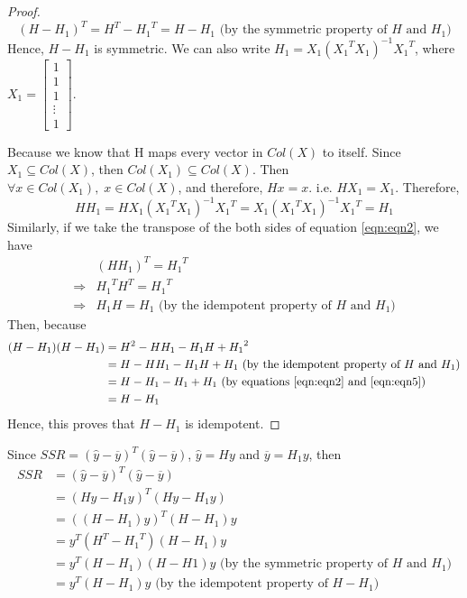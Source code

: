 \begin{answer}
\begin{proof}
    \begin{equation}
        {(H - H_1)}^T = H^T - {H_1}^T = H - H_1 \text{ (by the symmetric property of } H \text{ and } H_1 \text{)}
    \end{equation}
    Hence, $H-H_1$ is symmetric. We can also write $H_1 = X_1{({X_1}^TX_1)}^{-1}{X_1}^T$, where $X_1 = \left[\begin{smallmatrix}1 \\1\\1\\ \vdots\\1\end{smallmatrix}\right]$.
    
    Because we know that H maps every vector in $Col(X)$ to itself. Since $X_1 \subseteq Col(X)$, then $Col(X_1) \subseteq Col(X)$. Then $\forall x \in Col(X_1),\; x \in Col(X)$, and therefore, $Hx = x$. i.e. $HX_1 = X_1$.
     Therefore, 
    \begin{equation}
        HH_1 = HX_1{({X_1}^TX_1)}^{-1}{X_1}^{T} = X_1{({X_1}^TX_1)}^{-1}{X_1}^{T} = H_1 \label{eqn:eqn2}
    \end{equation}
    Similarly, if we take the transpose of the both sides of equation \ref{eqn:eqn2}, we have 
    \begin{align}
        &{(HH_1)}^T = {H_1}^T\\
        \Rightarrow & {H_1}^T H^T = {H_1}^T\\
        \Rightarrow & H_1H = H_1 \text{ (by the idempotent property of } H \text{ and } H_1 \text{)}\label{eqn:eqn5}
    \end{align}
    Then, because
    \begin{align}
        (H-H_1)(H-H_1) &= H^2 - HH_1 - H_1H + {H_1}^2\\ 
        &= H - HH_1 - H_1H + H_1 \text{ (by the idempotent property of } H \text{ and } H_1 \text{)}\\
        &= H - H_1 - H_1 + H_1 \text{ (by equations \ref{eqn:eqn2} and \ref{eqn:eqn5})}\\
        &= H - H_1
    \end{align}
    Hence, this proves that $H - H_1$ is idempotent.
\end{proof}
Since $SSR = {(\hat{y} - \overline{y})}^T(\hat{y} - \overline{y})$, $\hat{y} = Hy$ and $\overline{y} = H_1y$, then
\begin{align}
    SSR &= {(\hat{y} - \overline{y})}^T(\hat{y} - \overline{y})\\
    &= {(Hy - H_1y)}^T(Hy - H_1y)\\
    &= {((H-H_1)y)}^T(H - H_1)y\\
    &= y^T(H^T - {H_1}^T)(H - H_1)y\\
    &= y^T(H - H_1)(H-H1)y \text{ (by the symmetric property of } H \text{ and } H_1 \text{)}\\
    &= y^T(H-H_1)y \text{ (by the idempotent property of } H-H_1 \text{)}
\end{align}
\end{answer}